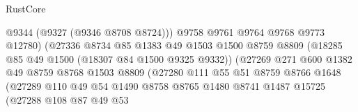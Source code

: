\begin{lexlean}{RustCore}
\begin{coremodule}
                                            @9344
                                            (@9327 (@9346 @8708 @8724)))
                                          @9758
                                          @9761
                                          @9764
                                          @9768
                                          @9773
                                          @12780)
                                        (@27336
                                          @8734
                                          @85
                                          @1383
                                          @49
                                          @1503
                                          @1500
                                          @8759
                                          @8809
                                          (@18285 @85 @49 @1500 (@18307 @84 @1500 @9325 @9332))
                                          (@27269
                                            @271
                                            @600
                                            @1382
                                            @49
                                            @8759
                                            @8768
                                            @1503
                                            @8809
                                            (@27280
                                              @111
                                              @55
                                              @51
                                              @8759
                                              @8766
                                              @1648
                                              (@27289
                                                @110
                                                @49
                                                @54
                                                @1490
                                                @8758
                                                @8765
                                                @1480
                                                @8741
                                                @1487
                                                @15725
                                                (@27288
                                                  @108
                                                  @87
                                                  @49
                                                  @53

\end{coremodule}
\end{lexlean}
